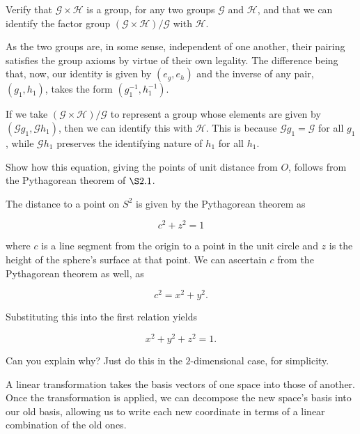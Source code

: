 \documentclass[../the-road-to-reality.tex]{subfiles}
\begin{document}
\begin{questions}
\question Verify that $\mathcal{G} \times \mathcal{H}$ is a group, for any two groups $\mathcal{G}$ and $\mathcal{H}$, and that we can identify the factor group $(\mathcal{G}\times\mathcal{H})/\mathcal{G}$ with $\mathcal{H}$.

\begin{solution}
        As the two groups are, in some sense, independent of one another, their pairing satisfies the group axioms by virtue of their own legality. The difference being that, now, our identity is given by $(e_g, e_h)$ and the inverse of any pair, $(g_1, h_1)$, takes the form $(g_1^{-1}, h_1^{-1})$.

        If we take $(\mathcal{G}\times\mathcal{H})/\mathcal{G}$ to represent a group whose elements are given by $(\mathcal{G}g_1, \mathcal{G}h_1)$, then we can identify this with $\mathcal{H}$. This is because $\mathcal{G}g_1 = \mathcal{G}$ for all $g_1$, while $\mathcal{G}h_1$ preserves the identifying nature of $h_1$ for all $h_1$.
\end{solution}

\question Show how this equation, giving the points of unit distance from $O$, follows from the Pythagorean theorem of $\S2.1$.

\begin{solution}
        The distance to a point on $S^2$ is given by the Pythagorean theorem as

\[
	c^2 + z^2 = 1
	\] 

        where $c$ is a line segment from the origin to a point in the unit circle and $z$ is the height of the sphere's surface at that point. We can ascertain $c$ from the Pythagorean theorem as well, as

	\[
        c^2 = x^2 + y^2
	.\] 

        Substituting this into the first relation yields

	\[
        x^2 + y^2 + z^2 = 1
	.\] 
\end{solution}

\question Can you explain why? Just do this in the $2$-dimensional case, for simplicity.

\begin{solution}
        A linear transformation takes the basis vectors of one space into those of another. Once the transformation is applied, we can decompose the new space's basis into our old basis, allowing us to write each new coordinate in terms of a linear combination of the old ones.
\end{solution}


\end{questions}
\end{document}
